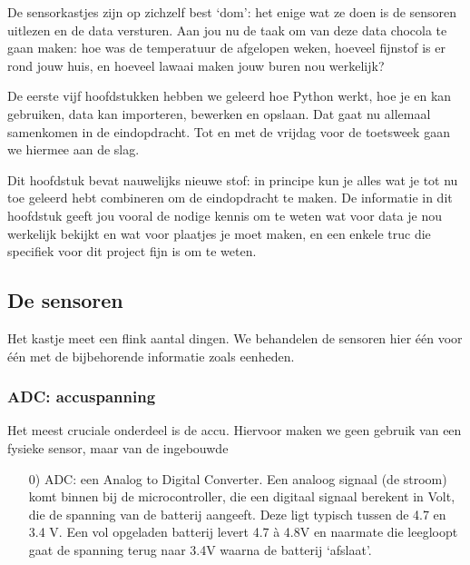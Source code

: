 \documentclass[a4paper,11pt, fleqn]{article}
\begin{document}
De sensorkastjes zijn op zichzelf best `dom': het enige wat ze doen is de sensoren uitlezen en de data versturen. Aan jou nu de taak om van deze data chocola te gaan maken: hoe was de temperatuur de afgelopen weken, hoeveel fijnstof is er rond jouw huis, en hoeveel lawaai maken jouw buren nou werkelijk?

De eerste vijf hoofdstukken hebben we geleerd hoe Python werkt, hoe je  en  kan gebruiken, data kan importeren, bewerken en opslaan. Dat gaat nu allemaal samenkomen in de eindopdracht. Tot en met de vrijdag voor de toetsweek gaan we hiermee aan de slag.

Dit hoofdstuk bevat nauwelijks nieuwe stof: in principe kun je alles wat je tot nu toe geleerd hebt combineren om de eindopdracht te maken. De informatie in dit hoofdstuk geeft jou vooral de nodige kennis om te weten wat voor data je nou werkelijk bekijkt en wat voor plaatjes je moet maken, en een enkele truc die specifiek voor dit project fijn is om te weten.

\subsection{De sensoren}
Het kastje meet een flink aantal dingen. We behandelen de sensoren hier \'e\'en voor \'e\'en met de bijbehorende informatie zoals eenheden.

\subsubsection{ADC: accuspanning}
Het meest cruciale onderdeel is de accu. Hiervoor maken we geen gebruik van een fysieke sensor, maar van de ingebouwde
\begin{itemize}
	\item[0)] ADC: een Analog to Digital Converter. Een analoog signaal (de stroom) komt binnen bij de microcontroller, die een digitaal signaal berekent in Volt, die de spanning van de batterij aangeeft. Deze ligt typisch tussen de 4.7 en 3.4 V. Een vol opgeladen batterij levert 4.7 \`a 4.8V en naarmate die leegloopt gaat de spanning terug naar 3.4V waarna de batterij `afslaat'.
\end{itemize}
\end{document}
